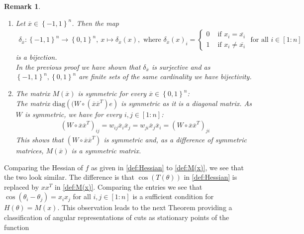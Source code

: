 \documentclass[12pt,a4paper]{article}
\theoremstyle{mythm}
\newtheorem*{rem}{Remark}
\begin{document}
\begin{rem}
\begin{enumerate}
\item 
Let $ \overline{ x } \in \left\{ -1,1 \right\} ^{ n }  $.
Then the map
\begin{align*}
\delta _{ \overline{ x }  }  : \left\{ -1,1 \right\} ^{ n }  \to \left\{ 0,1 \right\} ^{ n }  , \ x \mapsto \delta _{ \overline{ x }  } ( x ), \text{ where }   \delta _{ \overline{ x
} } (x)  _{ i } = \begin{cases}
0 & \text{ if } x_i = \overline{ x_i } \\
1 & \text{ if } x_i \neq \overline{ x_i }  
\end{cases}
\text{ for all } i \in \left[ 1:n \right]   
\end{align*} 
is a bijection. \\
In the previous proof we have shown that $ \delta _{ \overline{ x }  }  $ is surjective and as $ \left\{ -1,1 \right\} ^{ n } , \left\{ 0,1 \right\} ^{ n }  $ are finite sets
of the same cardinality we have bijectivity.
\item The matrix $ M ( \overline{ x } ) $ is symmetric for every $ \overline{ x } \in \left\{ 0,1 \right\} ^{ n }  $: \\
The matrix $ \text{diag} \left( ( W \circ \left( \overline{ x } \overline{ x } ^T  \right) e  \right)  $ is symmetric as it is a diagonal matrix.
As $ W $ is symmetric, we have for every $ i,j \in \left[ 1:n \right]  $:
\begin{align*}
\left( W \circ \overline{ x } \overline{ x } ^T	 \right) _{ ij } = w _{ ij } \overline{ x } _{ i } \overline{ x } _{ j } = w _{ ji } \overline{ x } _{ j } \overline{ x } _{ i
} = \left( W \circ \overline{ x } \overline{ x } ^T  \right) _{ ji } 
\end{align*} 
This shows that $ \left( W \circ \overline{ x } \overline{ x } ^T  \right)  $ is symmetric and, as a difference of symmetric matrices, $ M ( \overline{ x } )  $ is a symmetric
matrix.
\end{enumerate}
\end{rem} 
Comparing the Hessian of $ f $ as given in \ref{def:Hessian} to \ref{def:M(x)}, we see that the two look similar. 
The difference is that $ \cos( T(\theta) )  $ in \ref{def:Hessian} is replaced by $ x  x  ^T  $ in \ref{def:M(x)}. Comparing the entries we see that $
\cos( \theta_i - \theta_j ) = x_i x_j  $ for all $ i,j \in \left[ 1:n \right]  $ is a sufficient condition for $ H(\theta) = M(x) $.
This observation leads to the next Theorem providing a classification of angular representations of cuts as stationary points of the function 
\end{document}
